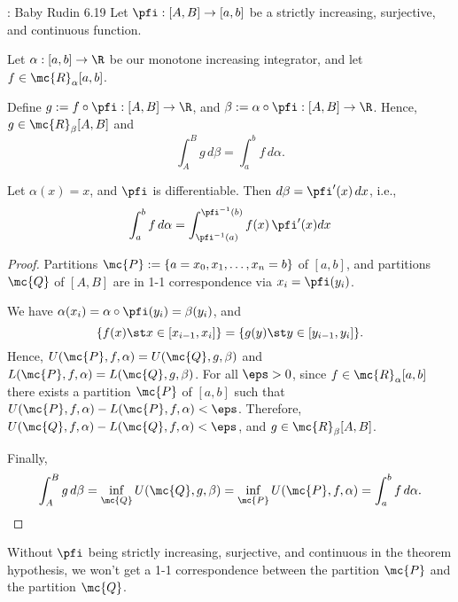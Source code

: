 \begin{ntheorem}{: Baby Rudin 6.19}
	Let \(\pfi:[A,B]\to [a,b]\) be a strictly increasing, surjective, and continuous function.
	
	\medskip
	
	Let \(\alpha:[a,b]\to\R\) be our monotone increasing integrator, and let \(f\in\mc{R}_{\alpha}[a,b]\).
	
	\medskip
	
	Define \(g:=f\circ\pfi:[A,B]\to\R\), and \(\beta:=\alpha\circ\pfi:[A,B]\to\R\). Hence, \(g\in\mc{R}_{\beta}[A,B]\) and 
	\begin{equation*}
		\int_A^B g \, d\beta=\int_a^b f \, d\alpha.
	\end{equation*}
\end{ntheorem}

\begin{example}
	Let \(\alpha(x)=x\), and \(\pfi\) is differentiable. Then \(d\beta=\pfi'(x) \, dx\), i.e., 
	\begin{equation*}
		\int_a^b f \, d\alpha=\int_{\pfi^{-1}(a)}^{\pfi^{-1}(b)} f(x) \, \pfi'(x)dx
	\end{equation*}
\end{example}
\begin{proof}
	Partitions \(\mc{P}:=\{a=x_0,x_1,\dots,x_n=b\}\) of \([a,b]\), and partitions \(\mc{Q}\) of \([A,B]\) are in 1-1 correspondence via \(x_i=\pfi(y_i)\).
	
	\medskip
	
	We have \(\alpha(x_i)=\alpha\circ\pfi(y_i)=\beta(y_i)\), and 
	\begin{equation*}
		\{f(x)\st x\in[x_{i-1},x_i]\}=\{g(y)\st y\in[y_{i-1},y_i]\}.
	\end{equation*}
	Hence, \(U(\mc{P},f,\alpha)=U(\mc{Q},g,\beta)\) and \(L(\mc{P},f,\alpha)=L(\mc{Q},g,\beta)\). For all \(\eps>0\), since \(f\in\mc{R}_{\alpha}[a,b]\) there exists a partition \(\mc{P}\) of \([a,b]\) such that \(U(\mc{P},f,\alpha)-L(\mc{P},f,\alpha)<\eps\). Therefore, \(U(\mc{Q},f,\alpha)-L(\mc{Q},f,\alpha)<\eps\), and \(g\in\mc{R}_{\beta}[A,B]\).
	
	\medskip
	
	Finally, 
	\begin{equation*}
		\int_A^B g \, d\beta=\inf_{\mc{Q}} U(\mc{Q},g,\beta)=\inf_{\mc{P}} U(\mc{P},f,\alpha)=\int_a^b f \, d\alpha.
	\end{equation*}
\end{proof}
\begin{note}
	Without \(\pfi\) being strictly increasing, surjective, and continuous in the theorem hypothesis, we won't get a 1-1 correspondence between the partition \(\mc{P}\) and the partition \(\mc{Q}\).
\end{note}

